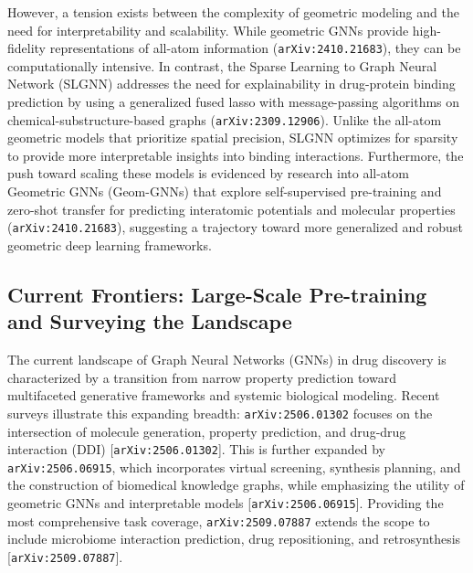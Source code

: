 \documentclass[11pt]{article}
\begin{document}
However, a tension exists between the complexity of geometric modeling and the need for interpretability and scalability. While geometric GNNs provide high-fidelity representations of all-atom information (\texttt{arXiv:2410.21683}), they can be computationally intensive. In contrast, the Sparse Learning to Graph Neural Network (SLGNN) addresses the need for explainability in drug-protein binding prediction by using a generalized fused lasso with message-passing algorithms on chemical-substructure-based graphs (\texttt{arXiv:2309.12906}). Unlike the all-atom geometric models that prioritize spatial precision, SLGNN optimizes for sparsity to provide more interpretable insights into binding interactions. Furthermore, the push toward scaling these models is evidenced by research into all-atom Geometric GNNs (Geom-GNNs) that explore self-supervised pre-training and zero-shot transfer for predicting interatomic potentials and molecular properties (\texttt{arXiv:2410.21683}), suggesting a trajectory toward more generalized and robust geometric deep learning frameworks.

\subsection{Current Frontiers: Large-Scale Pre-training and Surveying the Landscape}

The current landscape of Graph Neural Networks (GNNs) in drug discovery is characterized by a transition from narrow property prediction toward multifaceted generative frameworks and systemic biological modeling. Recent surveys illustrate this expanding breadth: \texttt{arXiv:2506.01302} focuses on the intersection of molecule generation, property prediction, and drug-drug interaction (DDI) [\texttt{arXiv:2506.01302}]. This is further expanded by \texttt{arXiv:2506.06915}, which incorporates virtual screening, synthesis planning, and the construction of biomedical knowledge graphs, while emphasizing the utility of geometric GNNs and interpretable models [\texttt{arXiv:2506.06915}]. Providing the most comprehensive task coverage, \texttt{arXiv:2509.07887} extends the scope to include microbiome interaction prediction, drug repositioning, and retrosynthesis [\texttt{arXiv:2509.07887}].
\end{document}
